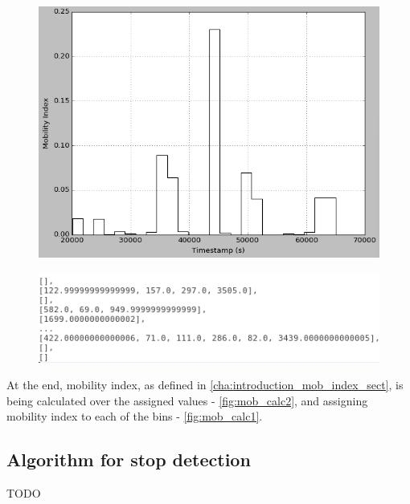 \begin{figure}
	\centering
	\begin{minipage}{.5\textwidth}
		\centering
		\includegraphics[width=.9\linewidth]{images/mob_calc1.png}
		\label{fig:mob_calc1}
	\end{minipage}%
	\begin{minipage}{.5\textwidth}
		\centering
		\includegraphics[width=.9\linewidth]{images/mob_calc2.png}
		\label{fig:mob_calc2}
	\end{minipage}
\end{figure}

\FloatBarrier

At the end, mobility index, as defined in \autoref{cha:introduction_mob_index_sect}, is being calculated over the assigned values - \autoref{fig:mob_calc2}, and assigning mobility index to each of the bins - \autoref{fig:mob_calc1}.

\subsection{Algorithm for stop detection}

TODO

